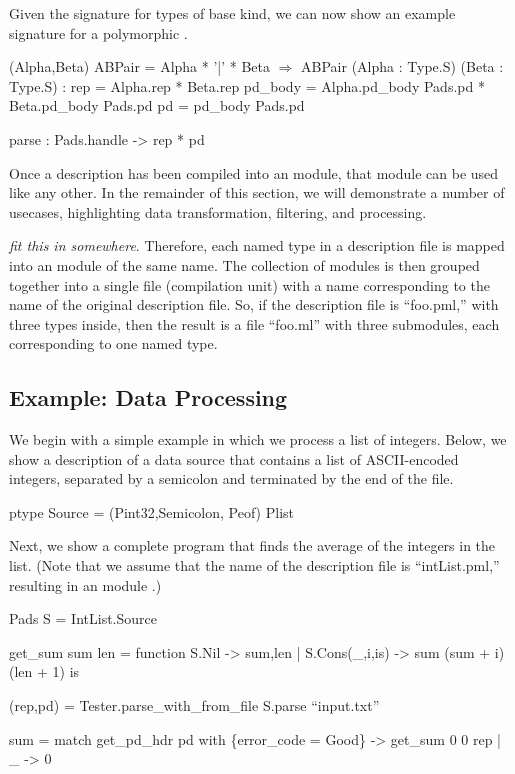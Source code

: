 Given the signature  for types of base kind, we can now
show an example signature for a polymorphic .
\begin{code}\scriptsize
{} (Alpha,Beta) ABPair = Alpha * '|' * Beta
\(\Longrightarrow\)
 ABPair (Alpha : Type.S) (Beta : Type.S) :
   rep = Alpha.rep * Beta.rep
   pd\_body = Alpha.pd\_body Pads.pd * 
                     Beta.pd\_body Pads.pd
   pd = pd\_body Pads.pd

   parse : Pads.handle -> rep * pd
\end{code}

Once a description has been compiled into an \ocaml{} module, that
module can be used like any other. In the remainder of this section,
we will demonstrate a number of usecases, highlighting data transformation,
filtering, and processing.

\emph{fit this in somewhere}.  Therefore, each named type in a
description file is mapped into an \ocaml module of the same name. The
collection of modules is then grouped together into a single file
(compilation unit) with a name corresponding to the name of the
original description file. So, if the description file is ``foo.pml,''
with three types inside, then the result is a file ``foo.ml'' with
three submodules, each corresponding to one named type.

\subsection{Example: Data Processing}
\label{sec:ex-process}

We begin with a simple example in which we process a list of
integers. Below, we show a description of a data source that contains
a list of ASCII-encoded integers, separated by a semicolon and
terminated by the end of the file.
\begin{code}\scriptsize
ptype Source = (Pint32,Semicolon, Peof) Plist\end{code}
Next, we show a complete \ocaml{} program that finds the average of
the integers in the list. (Note that we assume that the
name of the description file is ``intList.pml,'' resulting in an
\ocaml{} module .)
\begin{code}\scriptsize
{} Pads
 S = IntList.Source

 get_sum sum len = function
  S.Nil -> sum,len
| S.Cons(_,i,is) -> sum (sum + i) (len + 1) is
  
 (rep,pd) = Tester.parse_with_from_file S.parse ``input.txt''

 sum = match get_pd_hdr pd with
            \{error_code = Good\} -> get_sum 0 0 rep
          | _ -> 0\end{code}



